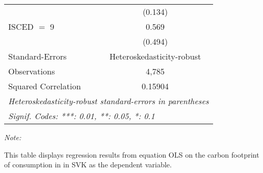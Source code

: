 \begin{table}[htbp!]
\begin{adjustbox}{width = 1\textwidth, max height = 0.95\textheight, center}
\begin{threeparttable}[b]
\begin{tabular}{lc}
                                & (0.134)\\   
            ISCED $=$ 9         & 0.569\\   
                                & (0.494)\\   
            \midrule 
            Standard-Errors     & Heteroskedasticity-robust \\   
            Observations        & 4,785\\  
            Squared Correlation & 0.15904\\  
            \midrule \midrule
            \multicolumn{2}{l}{\emph{Heteroskedasticity-robust standard-errors in parentheses}}\\
            \multicolumn{2}{l}{\emph{Signif. Codes: ***: 0.01, **: 0.05, *: 0.1}}\\
         \end{tabular}
         
         \begin{tablenotes}\item \medskip \textit{Note:}
            \item This table displays regression results from equation OLS on the carbon footprint of consumption in  in SVK as the dependent variable.  
         \end{tablenotes}
      \end{threeparttable}
   \end{adjustbox}
\end{table}


